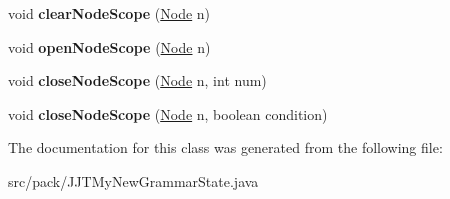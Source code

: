 \begin{DoxyCompactItemize}
\item 
void {\bfseries clear\+Node\+Scope} (\hyperlink{interfacepack_1_1_node}{Node} n)\hypertarget{classpack_1_1_j_j_t_my_new_grammar_state_a7ab62adf8ecb61656229ae20da0eb924}{}\label{classpack_1_1_j_j_t_my_new_grammar_state_a7ab62adf8ecb61656229ae20da0eb924}

\item 
void {\bfseries open\+Node\+Scope} (\hyperlink{interfacepack_1_1_node}{Node} n)\hypertarget{classpack_1_1_j_j_t_my_new_grammar_state_a5f0b4dba842cbfec468b2ec576ba9f2a}{}\label{classpack_1_1_j_j_t_my_new_grammar_state_a5f0b4dba842cbfec468b2ec576ba9f2a}

\item 
void {\bfseries close\+Node\+Scope} (\hyperlink{interfacepack_1_1_node}{Node} n, int num)\hypertarget{classpack_1_1_j_j_t_my_new_grammar_state_a5132b7e75ae0c946b1aea8c3e7e9ad85}{}\label{classpack_1_1_j_j_t_my_new_grammar_state_a5132b7e75ae0c946b1aea8c3e7e9ad85}

\item 
void {\bfseries close\+Node\+Scope} (\hyperlink{interfacepack_1_1_node}{Node} n, boolean condition)\hypertarget{classpack_1_1_j_j_t_my_new_grammar_state_aaf4623ddfd77113ee86eac2ee7ba1569}{}\label{classpack_1_1_j_j_t_my_new_grammar_state_aaf4623ddfd77113ee86eac2ee7ba1569}

\end{DoxyCompactItemize}


The documentation for this class was generated from the following file\+:\begin{DoxyCompactItemize}
\item 
src/pack/J\+J\+T\+My\+New\+Grammar\+State.\+java\end{DoxyCompactItemize}
